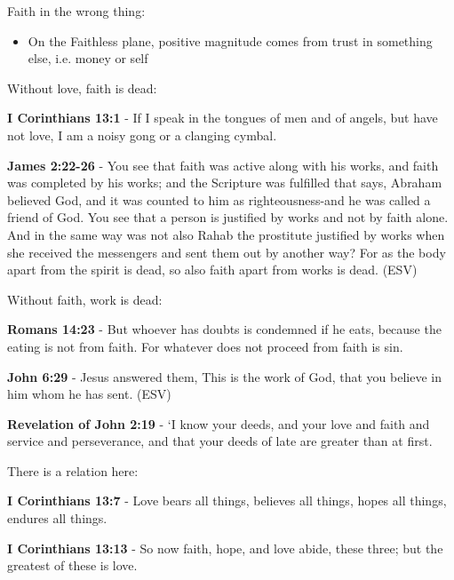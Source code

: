 \documentclass[11pt]{article}
\begin{document}
Faith in the wrong thing:
\begin{itemize}
\item On the Faithless plane, positive magnitude comes from trust in something else, i.e. money or self
\end{itemize}

Without love, faith is dead:

\textbf{I Corinthians 13:1} - If I speak in the tongues of men and of angels, but have not love, I am a noisy gong or a clanging cymbal.

\textbf{James 2:22-26} - You see that faith was active along with his works, and faith was completed by his works; and the Scripture was fulfilled that says, Abraham believed God, and it was counted to him as righteousness-and he was called a friend of God. You see that a person is justified by works and not by faith alone. And in the same way was not also Rahab the prostitute justified by works when she received the messengers and sent them out by another way? For as the body apart from the spirit is dead, so also faith apart from works is dead. (ESV)

Without faith, work is dead:

\textbf{Romans 14:23} - But whoever has doubts is condemned if he eats, because the eating is not from faith. For whatever does not proceed from faith is sin.

\textbf{John 6:29} - Jesus answered them, This is the work of God, that you believe in him whom he has sent. (ESV)

\textbf{Revelation of John 2:19} - ‘I know your deeds, and your love and faith and service and perseverance, and that your deeds of late are greater than at first.

There is a relation here:

\textbf{I Corinthians 13:7} - Love bears all things, believes all things, hopes all things, endures all things.

\textbf{I Corinthians 13:13} - So now faith, hope, and love abide, these three; but the greatest of these is love.
\end{document}
